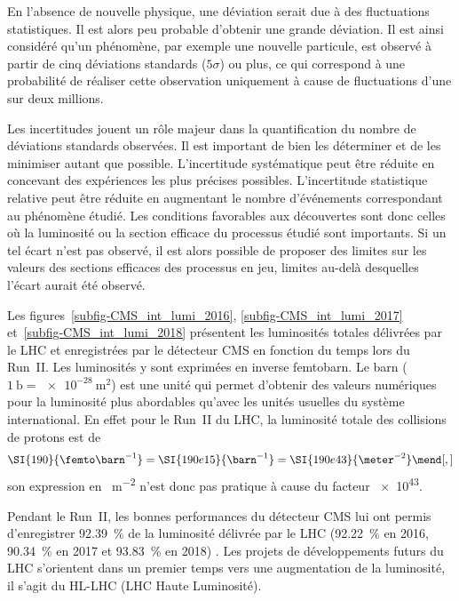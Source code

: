 En l'absence de nouvelle physique, une déviation serait due à des fluctuations statistiques.
Il est alors peu probable d'obtenir une grande déviation.
Il est ainsi considéré qu'un phénomène, par exemple une nouvelle particule, est observé à partir de cinq déviations standards ($5\sigma$) ou plus, ce qui correspond à une probabilité de réaliser cette observation uniquement à cause de fluctuations d'une sur deux millions.
\par
Les incertitudes jouent un rôle majeur dans la quantification du nombre de déviations standards observées.
Il est important de bien les déterminer et de les minimiser autant que possible.
L'incertitude systématique peut être réduite en concevant des expériences les plus précises possibles.
L'incertitude statistique relative peut être réduite en augmentant le nombre d'événements correspondant au phénomène étudié.
Les conditions favorables aux découvertes sont donc celles où la luminosité ou la section efficace du processus étudié sont importants.
Si un tel écart n'est pas observé, il est alors possible de proposer des limites sur les valeurs des sections efficaces des processus en jeu, limites au-delà desquelles l'écart aurait été observé.
\par Les figures~\ref{subfig-CMS_int_lumi_2016}, \ref{subfig-CMS_int_lumi_2017} et~\ref{subfig-CMS_int_lumi_2018} présentent les luminosités totales délivrées par le LHC et enregistrées par le détecteur CMS en fonction du temps lors du Run~II.
Les luminosités y sont exprimées en inverse femtobarn.
Le barn ($\SI{1}{\barn}=\SI{e-28}{\meter^2}$) est une unité qui permet d'obtenir des valeurs numériques pour la luminosité plus abordables qu'avec les unités usuelles du système international.
En effet pour le Run~II du LHC, la luminosité totale des collisions de protons est de
\begin{equation}
\SI{190}{\femto\barn^{-1}} = \SI{190e15}{\barn^{-1}} = \SI{190e43}{\meter^{-2}}
\mend[,]
\end{equation}
son expression en \SI{}{\meter^{-2}} n'est donc pas pratique à cause du facteur \num{e43}.
\par Pendant le Run~II, les bonnes performances du détecteur CMS lui ont permis d'enregistrer \SI{92.39}{\%} de la luminosité délivrée par le LHC (\SI{92.22}{\%} en 2016, \SI{90.34}{\%} en 2017 et \SI{93.83}{\%} en 2018) \cite{CMS-PAS-LUM-17-001,CMS-PAS-LUM-17-004,CMS-PAS-LUM-18-002}.
Les projets de développements futurs du LHC s'orientent dans un premier temps vers une augmentation de la luminosité, il s'agit du \og HL-LHC \fg{} (LHC Haute Luminosité).
